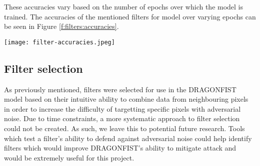 		These accuracies vary based on the number of epochs over which the model is trained. The accuracies of the mentioned filters for model over varying epochs can be seen in Figure \ref{f:filters:accuracies}.
		\begin{figure*}
			\texttt{[image: filter-accuracies.jpeg]}
			\caption{Classification accuracy during training for various image filters.}
			\label{f:filters:accuracies}
		\end{figure*}

	\subsection{Filter selection} \label{s:filters:selection}
		As previously mentioned, filters were selected for use in the DRAGONFIST model based on their intuitive ability to combine data from neighbouring pixels in order to increase the difficulty of targetting specific pixels with adversarial noise. Due to time constraints, a more systematic approach to filter selection could not be created. As such, we leave this to potential future research. Tools which test a filter's ability to defend against adversarial noise could help identify filters which would improve DRAGONFIST's ability to mitigate attack and would be extremely useful for this project.
